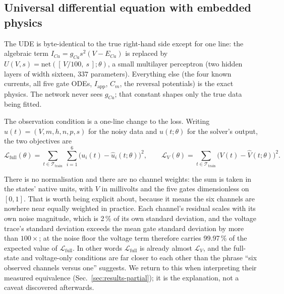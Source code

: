 \documentclass{article}
\newcommand{\NparamUde}{337}   %
\newcommand{\NoisePct}{2}      %
\newcommand{\NNinputs}{[\,V/100,\ s\,]}              %
\newcommand{\LossShareV}{99.97}
\newcommand{\GateSdRatio}{100}  %
\begin{document}
\subsection{Universal differential equation with embedded physics}

The UDE is byte-identical to the true right-hand side except for one line: the
algebraic term $I_{Ca}=g_{Ca}s^2(V-E_{Ca})$ is replaced by
$U(V,s)=\mathrm{net}(\NNinputs;\theta)$, a small multilayer perceptron
(two hidden layers of width sixteen, $\NparamUde$ parameters). Everything
else (the four known currents, all five gate ODEs, $I_{\mathrm{app}}$, $C_m$, the
reversal potentials) is the exact physics. The network never sees $g_{Ca}$; that
constant shapes only the true data being fitted.

The observation condition is a one-line change to the loss. Writing
$u(t)=(V,m,h,n,p,s)$ for the noisy data and $\hat u(t;\theta)$ for the solver's
output, the two objectives are
\begin{equation}
  \mathcal{L}_{\mathrm{full}}(\theta)
    = \sum_{t\in\mathcal{T}_{\mathrm{train}}}\ \sum_{i=1}^{6}
      \bigl(u_i(t)-\hat u_i(t;\theta)\bigr)^2,
  \qquad
  \mathcal{L}_{V}(\theta)
    = \sum_{t\in\mathcal{T}_{\mathrm{train}}}
      \bigl(V(t)-\hat V(t;\theta)\bigr)^2 .
  \label{eq:loss}
\end{equation}

There is no normalisation and there are no channel weights: the sum is taken in
the states' native units, with $V$ in millivolts and the five gates
dimensionless on $[0,1]$. That is worth being explicit about, because it means
the six channels are nowhere near equally weighted in practice. Each channel's
residual scales with its own noise magnitude, which is \NoisePct\,\% of its own
standard deviation, and the voltage trace's standard deviation exceeds the mean
gate standard deviation by more than $\GateSdRatio\times$; at the noise floor the
voltage term therefore carries \LossShareV\,\% of the expected value of
$\mathcal{L}_{\mathrm{full}}$. In other words $\mathcal{L}_{\mathrm{full}}$ is
already almost $\mathcal{L}_{V}$, and the full-state and voltage-only conditions
are far closer to each other than the phrase ``six observed channels versus one''
suggests. We return to this when interpreting their measured equivalence
(Sec.~\ref{sec:results-partial}); it is the explanation, not a caveat discovered
afterwards.
\end{document}
